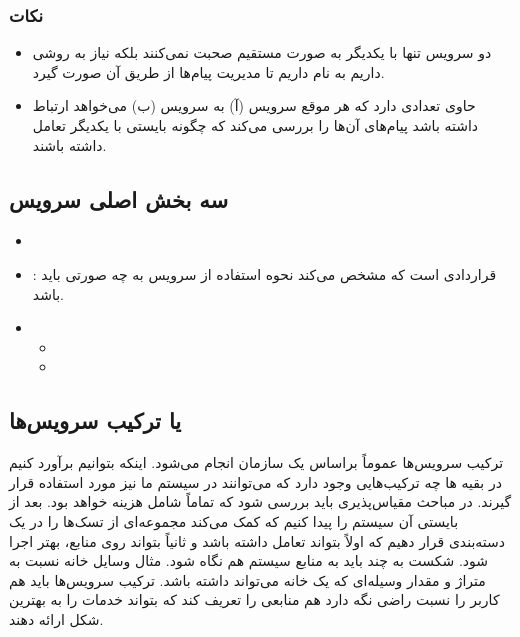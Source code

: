 \subsubsection*{نکات}

\begin{itemize}
    \item دو سرویس تنها با یکدیگر به صورت مستقیم صحبت نمی‌کنند بلکه نیاز به روشی
    داریم به نام  داریم تا مدیریت پیام‌ها از
    طریق آن صورت گیرد.
    \item {} حاوی تعدادی  دارد که هر موقع سرویس (آ) به سرویس
    (ب) می‌خواهد ارتباط داشته باشد پیام‌های آن‌ها را بررسی می‌کند که چگونه
    بایستی با یکدیگر تعامل داشته باشند.
\end{itemize}

\subsection{سه بخش اصلی سرویس}

\begin{itemize}
    \item {}
    \item {}: قراردادی است که مشخص می‌کند نحوه استفاده از
    سرویس به چه صورتی باید باشد.
    \item {}
    \begin{itemize}
        \item {}
        \item {}
    \end{itemize}
\end{itemize}

\subsection{ یا ترکیب سرویس‌ها}

ترکیب سرویس‌ها عموماً براساس  یک سازمان انجام می‌شود. اینکه بتوانیم
برآورد کنیم در بقیه ها چه ترکیب‌هایی وجود دارد که می‌توانند در
سیستم ما نیز مورد استفاده قرار گیرند. در مباحث مقیاس‌پذیری باید بررسی شود که
تماماً شامل هزینه خواهد بود. بعد از  بایستی  آن
سیستم را پیدا کنیم که کمک می‌کند مجموعه‌ای از تسک‌ها را در یک دسته‌بندی قرار
دهیم که اولاً بتواند تعامل داشته باشد و ثانیاً بتواند روی منابع، بهتر اجرا شود.
شکست  به چند  باید به منابع سیستم هم نگاه شود.
مثال وسایل خانه نسبت به متراژ و مقدار وسیله‌ای که یک خانه می‌تواند داشته باشد.
ترکیب سرویس‌ها باید هم کاربر را نسبت  راضی نگه دارد هم منابعی را تعریف
کند که بتواند خدمات را به بهترین شکل ارائه دهند.
